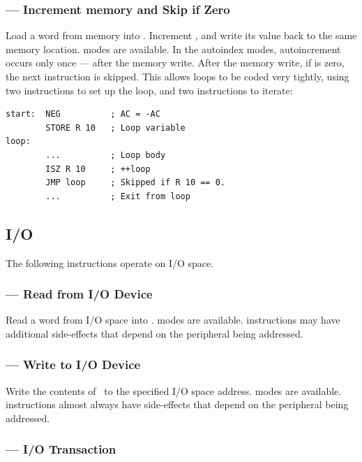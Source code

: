 \subsubsection{ — Increment memory and Skip if Zero}
\label{sec:instruction-ISZ}

Load a word from memory into \A. Increment \A{}, and write its value back to
the same memory location. \AMGroupOne modes are available. In the autoindex
modes, autoincrement occurs only once — after the memory write. After the
memory write, if \AC{} is zero, the next instruction is skipped. This allows
loops to be coded very tightly, using two instructions to set up the loop, and
two instructions to iterate:

\begin{lstlisting}[language=cftasm]
start:  NEG          ; AC = -AC
        STORE R 10   ; Loop variable
loop:   
        ...          ; Loop body
        ISZ R 10     ; ++loop
        JMP loop     ; Skipped if R 10 == 0.
        ...          ; Exit from loop
\end{lstlisting}

\subsection{I/O}

The following instructions operate on I/O space.

\subsubsection{ — Read from I/O Device}
\label{sec:instruction-IN}

Read a word from I/O space into \A. \AMGroupOne modes are available. 
instructions may have additional side-effects that depend on the peripheral
being addressed.

\subsubsection{ — Write to I/O Device}
\label{sec:instruction-OUT}

Write the contents of \A\ to the specified I/O space address. \AMGroupOne modes
are available.  instructions almost always have side-effects that
depend on the peripheral being addressed.

\subsubsection{ — I/O Transaction}
\label{sec:instruction-IOT}

